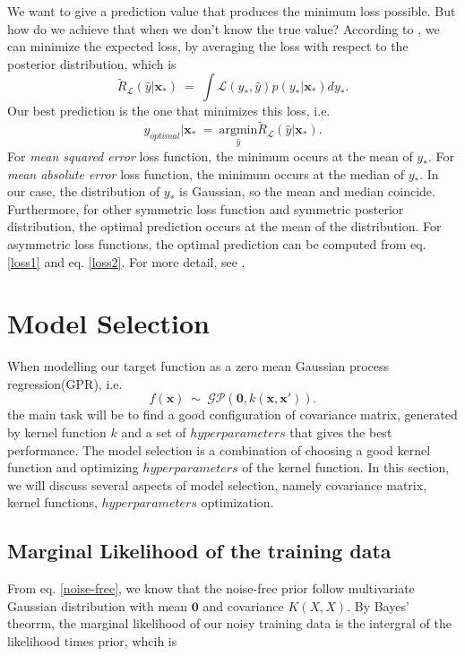 \documentclass[11pt,a4paper]{article}
\theoremstyle{definition}
\newcommand{\GP}{\mathcal{GP}}
\numberwithin{equation}{section}
\let\vec\mathbf
\begin{document}
We want to give a prediction value that produces the minimum loss possible. But how do we achieve that when we don't know the true value? According to \cite[Rasmussen and Williams, sec 2.4]{RandW}, we can minimize the expected loss, by averaging the loss with respect to the posterior distribution, which is 
\begin{equation}\label{loss1}
\tilde{R}_{\mathcal{L}}(\hat y|\vec x_*)\ = \ \int\mathcal{L}(y_*,\hat y)p(y_*|\vec x_*)dy_*.
\end{equation}\label{loss2}
Our best prediction is the one that minimizes this loss, i.e.
\begin{equation}
y_{optimal}|\vec x_*\ = \ \underset{\hat y}{\mathrm{argmin}}\tilde{R}_{\mathcal{L}}(\hat y|\vec x_*).
\end{equation}
For \textit{mean squared error} loss function, the minimum occurs at the mean of $y_*$. For \textit{mean absolute error} loss function, the minimum occurs at the median of $y_*$. In our case, the distribution of $y_*$ is Gaussian, so the mean and median coincide. Furthermore, for other symmetric loss function and symmetric posterior distribution, the optimal prediction occurs at the mean of the distribution. For asymmetric loss functions, the optimal prediction can be computed from eq. \ref{loss1} and eq. \ref{loss2}. For more detail, see \cite[Berger]{Berger}.

\newpage
\section{Model Selection}
When modelling our target function as a zero mean Gaussian process regression(GPR), i.e.
\begin{equation*} \label{}
f(\vec x) \  \sim \ \GP\left(\vec 0,k(\vec{x},\vec{x'})  \right).
\end{equation*}
the main task will be to find a good configuration of covariance matrix, generated by kernel function $k$ and a set of $hyperparameters$ that gives the best performance. The model selection is a combination of choosing a good kernel function and optimizing $hyperparameters$ of the kernel function. In this section, we will discuss several aspects of model selection, namely covariance matrix, kernel functions, $hyperparameters$ optimization.

\subsection{Marginal Likelihood of the training data}\label{lik}
From eq. \ref{noise-free}, we know that the noise-free prior follow multivariate Gaussian distribution with mean $\vec 0$ and covariance $K(X,X)$. By Bayes' theorrm, the marginal likelihood of our noisy training data is the intergral of the likelihood times prior, whcih is 
\end{document}
